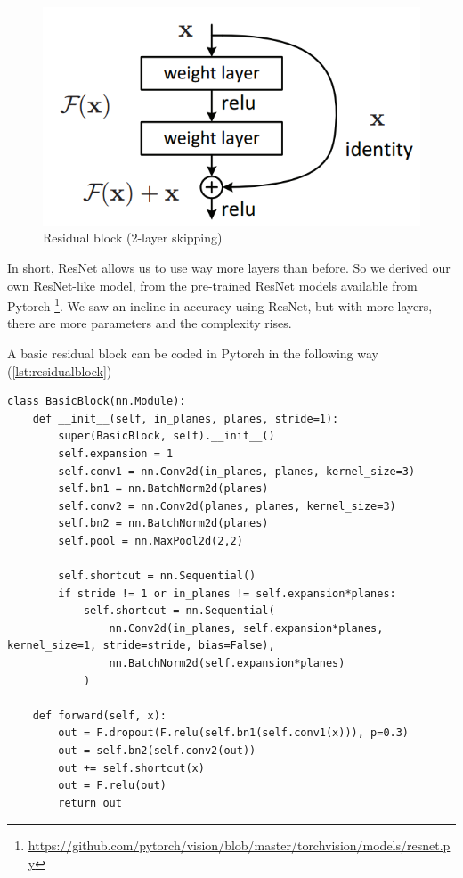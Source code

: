 \begin{figure}[H]
  \includegraphics[scale=0.5]{fig/residualblock.png}
  \centering
  \caption{Residual block (2-layer skipping)}
  \label{fig:residualblock}
\end{figure}

In short, ResNet allows us to use way more layers than before. So we derived our own ResNet-like model, from the pre-trained ResNet models available from Pytorch \footnote{\url{https://github.com/pytorch/vision/blob/master/torchvision/models/resnet.py}}. We saw an incline in accuracy using ResNet, but with more layers, there are more parameters and the complexity rises.

A basic residual block can be coded in Pytorch in the following way (\ref{lst:residualblock})

\begin{lstlisting}[caption={Pytorch Code for Residual Block}, label={lst:residualblock}, frame=single, breaklines=true]
class BasicBlock(nn.Module):
    def __init__(self, in_planes, planes, stride=1):
        super(BasicBlock, self).__init__()
        self.expansion = 1
        self.conv1 = nn.Conv2d(in_planes, planes, kernel_size=3)
        self.bn1 = nn.BatchNorm2d(planes)
        self.conv2 = nn.Conv2d(planes, planes, kernel_size=3)
        self.bn2 = nn.BatchNorm2d(planes)
        self.pool = nn.MaxPool2d(2,2)

        self.shortcut = nn.Sequential()
        if stride != 1 or in_planes != self.expansion*planes:
            self.shortcut = nn.Sequential(
                nn.Conv2d(in_planes, self.expansion*planes, kernel_size=1, stride=stride, bias=False),
                nn.BatchNorm2d(self.expansion*planes)
            )

    def forward(self, x):
        out = F.dropout(F.relu(self.bn1(self.conv1(x))), p=0.3)
        out = self.bn2(self.conv2(out))
        out += self.shortcut(x)
        out = F.relu(out)
        return out
\end{lstlisting}

